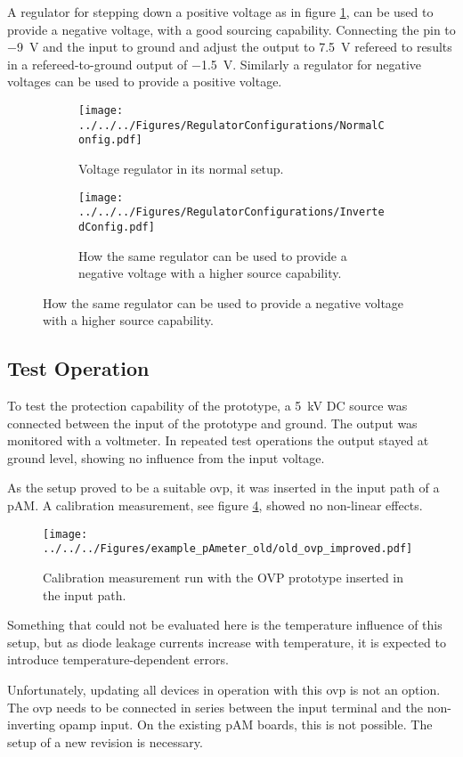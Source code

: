 A regulator for stepping down a positive voltage as in figure \ref{fig:RegulatorConfig:normal}, can be used to provide a negative voltage, with a good sourcing capability. Connecting the  pin to \SI{-9}{\volt} and the input to ground and adjust the output to \SI{+7.5}{\volt} refereed to  results in a refereed-to-ground output of \SI{-1.5}{\volt}. Similarly a regulator for negative voltages can be used to provide a positive voltage.
\begin{figure}
	\centering
	\begin{subfigure}[t]{0.49\textwidth}
		\centering
		\texttt{[image: ../../../Figures/RegulatorConfigurations/NormalConfig.pdf]}
		\caption{Voltage regulator in its normal setup.}
		\label{fig:RegulatorConfig:normal}
	\end{subfigure}
	\begin{subfigure}[t]{0.49\textwidth}
		\centering
		\texttt{[image: ../../../Figures/RegulatorConfigurations/InvertedConfig.pdf]}
		\caption{How the same regulator can be used to provide a negative voltage with a higher source capability.}
		\label{fig:RegulatorConfig:inverted}
	\end{subfigure}	
\end{figure}

\subsection{Test Operation}
To test the protection capability of the prototype, a \SI{5}{\kilo\volt} DC source was connected between the input of the prototype and ground. The output was monitored with a voltmeter. In repeated test operations the output stayed at ground level, showing no influence from the input voltage.

As the setup proved to be a suitable \ac{ovp}, it was inserted in the input path of a \ac{pAM}. A calibration measurement, see figure \ref{fig:ovptest}, showed no non-linear effects.
\begin{figure}
	\centering
	\texttt{[image: ../../../Figures/example\_pAmeter\_old/old\_ovp\_improved.pdf]}
	\caption{Calibration measurement run with the OVP prototype inserted in the input path.}
	\label{fig:ovptest}
\end{figure}
Something that could not be evaluated here is the temperature influence of this setup, but as diode leakage currents increase with temperature, it is expected to introduce temperature-dependent errors. 

Unfortunately, updating all devices in operation with this \ac{ovp} is not an option. The \ac{ovp} needs to be connected in series between the input terminal and the non-inverting \ac{opamp} input. On the existing \ac{pAM} boards, this is not possible. The setup of a new revision is necessary.

